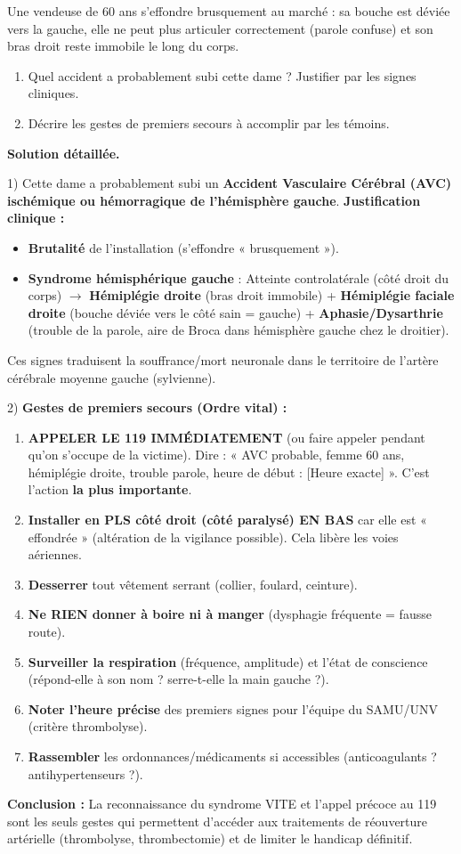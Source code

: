 \documentclass[11pt]{article}
\begin{document}
\begin{exoresolu}
Une vendeuse de 60 ans s'effondre brusquement au marché : sa bouche est déviée vers la gauche, elle ne peut plus articuler correctement (parole confuse) et son bras droit reste immobile le long du corps.
\begin{enumerate}
\item Quel accident a probablement subi cette dame ? Justifier par les signes cliniques.
\item Décrire les gestes de premiers secours à accomplir par les témoins.
\end{enumerate}
\tcblower
\textbf{Solution détaillée.}

1) Cette dame a probablement subi un \textbf{Accident Vasculaire Cérébral (AVC) ischémique ou hémorragique de l'hémisphère gauche}.
\textbf{Justification clinique :}
\begin{itemize}
\item \textbf{Brutalité} de l'installation (s'effondre « brusquement »).
\item \textbf{Syndrome hémisphérique gauche} : Atteinte controlatérale (côté droit du corps) $\rightarrow$ \textbf{Hémiplégie droite} (bras droit immobile) + \textbf{Hémiplégie faciale droite} (bouche déviée vers le côté sain = gauche) + \textbf{Aphasie/Dysarthrie} (trouble de la parole, aire de Broca dans hémisphère gauche chez le droitier).
\end{itemize}
Ces signes traduisent la souffrance/mort neuronale dans le territoire de l'artère cérébrale moyenne gauche (sylvienne).

2) \textbf{Gestes de premiers secours (Ordre vital) :}
\begin{enumerate}
\item \textbf{APPELER LE 119 IMMÉDIATEMENT} (ou faire appeler pendant qu'on s'occupe de la victime). Dire : « AVC probable, femme 60 ans, hémiplégie droite, trouble parole, heure de début : [Heure exacte] ». C'est l'action \textbf{la plus importante}.
\item \textbf{Installer en PLS côté droit (côté paralysé) EN BAS} car elle est « effondrée » (altération de la vigilance possible). Cela libère les voies aériennes.
\item \textbf{Desserrer} tout vêtement serrant (collier, foulard, ceinture).
\item \textbf{Ne RIEN donner à boire ni à manger} (dysphagie fréquente = fausse route).
\item \textbf{Surveiller la respiration} (fréquence, amplitude) et l'état de conscience (répond-elle à son nom ? serre-t-elle la main gauche ?).
\item \textbf{Noter l'heure précise} des premiers signes pour l'équipe du SAMU/UNV (critère thrombolyse).
\item \textbf{Rassembler} les ordonnances/médicaments si accessibles (anticoagulants ? antihypertenseurs ?).
\end{enumerate}
\textbf{Conclusion :} La reconnaissance du syndrome VITE et l'appel précoce au 119 sont les seuls gestes qui permettent d'accéder aux traitements de réouverture artérielle (thrombolyse, thrombectomie) et de limiter le handicap définitif.
\end{exoresolu}
\end{document}
